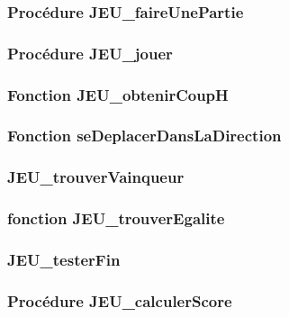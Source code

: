 \documentclass{report}
\begin{document}
            \subsubsection{ Procédure JEU\_faireUnePartie}
            
              \bigskip 
         
            \subsubsection{ Procédure JEU\_jouer}
              \bigskip 
            
             \subsubsection{Fonction JEU\_obtenirCoupH}
                \bigskip 
            
             \subsubsection{Fonction seDeplacerDansLaDirection}
                \bigskip 
            
             \subsubsection{JEU\_trouverVainqueur}
                \bigskip 

               \subsubsection{fonction JEU\_trouverEgalite}
                  \bigskip  
            
               \subsubsection{JEU\_testerFin}
                  \bigskip 
             
             \subsubsection{Procédure JEU\_calculerScore}
                \bigskip 
             
\end{document}
